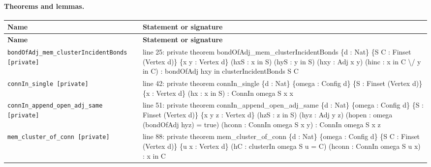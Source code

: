 \documentclass[10pt]{article}
\begin{document}
\paragraph{Theorems and lemmas.}
\begin{longtable}{>{\raggedright\arraybackslash}p{} >{\raggedright\arraybackslash}p{}}
\textbf{Name} & \textbf{Statement or signature} \\
\hline
\endfirsthead
\textbf{Name} & \textbf{Statement or signature} \\
\hline
\endhead
\texttt{bondOfAdj\_\allowbreak{}mem\_\allowbreak{}clusterIncidentBonds [private]} & {\ttfamily\scriptsize line 25:\allowbreak{} private theorem bondOfAdj\_\allowbreak{}mem\_\allowbreak{}clusterIncidentBonds \{d :\allowbreak{} Nat\} \{S C :\allowbreak{} Finset (\allowbreak{}Vertex d)\allowbreak{}\} \{x y :\allowbreak{} Vertex d\} (\allowbreak{}hxS :\allowbreak{} x in S)\allowbreak{} (\allowbreak{}hyS :\allowbreak{} y in S)\allowbreak{} (\allowbreak{}hxy :\allowbreak{} Adj x y)\allowbreak{} (\allowbreak{}hinc :\allowbreak{} x in C \textbackslash{}/\allowbreak{} y in C)\allowbreak{} :\allowbreak{} bondOfAdj hxy in clusterIncidentBonds S C} \\[0.45em]
\texttt{connIn\_\allowbreak{}single [private]} & {\ttfamily\scriptsize line 42:\allowbreak{} private theorem connIn\_\allowbreak{}single \{d :\allowbreak{} Nat\} \{omega :\allowbreak{} Config d\} \{S :\allowbreak{} Finset (\allowbreak{}Vertex d)\allowbreak{}\} \{x :\allowbreak{} Vertex d\} (\allowbreak{}hx :\allowbreak{} x in S)\allowbreak{} :\allowbreak{} ConnIn omega S x x} \\[0.45em]
\texttt{connIn\_\allowbreak{}append\_\allowbreak{}open\_\allowbreak{}adj\_\allowbreak{}same [private]} & {\ttfamily\scriptsize line 51:\allowbreak{} private theorem connIn\_\allowbreak{}append\_\allowbreak{}open\_\allowbreak{}adj\_\allowbreak{}same \{d :\allowbreak{} Nat\} \{omega :\allowbreak{} Config d\} \{S :\allowbreak{} Finset (\allowbreak{}Vertex d)\allowbreak{}\} \{x y z :\allowbreak{} Vertex d\} (\allowbreak{}hzS :\allowbreak{} z in S)\allowbreak{} (\allowbreak{}hyz :\allowbreak{} Adj y z)\allowbreak{} (\allowbreak{}hopen :\allowbreak{} omega (\allowbreak{}bondOfAdj hyz)\allowbreak{} =\allowbreak{} true)\allowbreak{} (\allowbreak{}hconn :\allowbreak{} ConnIn omega S x y)\allowbreak{} :\allowbreak{} ConnIn omega S x z} \\[0.45em]
\texttt{mem\_\allowbreak{}cluster\_\allowbreak{}of\_\allowbreak{}conn [private]} & {\ttfamily\scriptsize line 88:\allowbreak{} private theorem mem\_\allowbreak{}cluster\_\allowbreak{}of\_\allowbreak{}conn \{d :\allowbreak{} Nat\} \{omega :\allowbreak{} Config d\} \{S C :\allowbreak{} Finset (\allowbreak{}Vertex d)\allowbreak{}\} \{u x :\allowbreak{} Vertex d\} (\allowbreak{}hC :\allowbreak{} clusterIn omega S u =\allowbreak{} C)\allowbreak{} (\allowbreak{}hconn :\allowbreak{} ConnIn omega S u x)\allowbreak{} :\allowbreak{} x in C} \\[0.45em]

\end{longtable}
\end{document}
